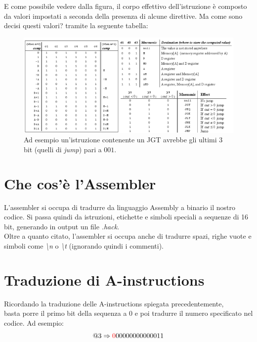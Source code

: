 \documentclass[12pt]{article}
\begin{document}
E come possibile vedere dalla figura, il corpo effettivo dell'istruzione è composto da valori impostati a seconda della presenza di alcune direttive. Ma come sono decisi questi valori? tramite la seguente tabella:
\begin{figure}[H]
    \centering
    \includegraphics[width=1\textwidth, height=.7\textheight,keepaspectratio]{realizzare_HACK/tabella_c_instruction.png} %
    \begin{center}
        \caption{\label{fig:c_instruction_tabella}Ad esempio un'istruzione contenente un JGT avrebbe gli ultimi 3 bit (quelli di \textit{jump}) pari a $001$.} %
    \end{center}
\end{figure}

\section{Che cos'è l'Assembler}
\label{sec:whats_assembler}
L'assembler si occupa di tradurre da linguaggio Assembly a binario il nostro codice. Si passa quindi da istruzioni, etichette e simboli speciali a sequenze di 16 bit, generando in output un file \textit{.hack}.
\\
Oltre a quanto citato, l'assembler si occupa anche di tradurre spazi, righe vuote e simboli come \textit{\textbackslash{n}} o \textit{\textbackslash{t}} (ignorando quindi i commenti).

\section{Traduzione di A-instructions}
\label{sec:a_instructions_translation_details}
Ricordando la traduzione delle A-instructions spiegata precedentemente,
\\
basta porre il primo bit della sequenza a 0 e poi tradurre il numero specificato nel codice. Ad esempio:
\[ @3 \Rightarrow \textcolor{red}{0}00000000000011 \]
\end{document}

